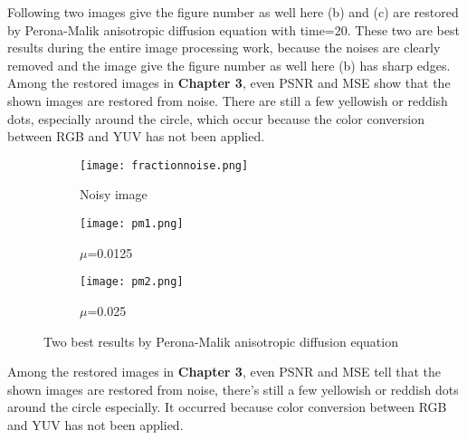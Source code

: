\documentclass[12pt]{report}
\begin{document}
\begin{tableofcontents}
Following two images give the figure number as well here (b) and (c) are restored by Perona-Malik anisotropic diffusion equation with time=20. These two are best results during the entire image processing work, because the noises are clearly removed and the image give the figure number as well here (b) has sharp edges. Among the restored images in \textbf{Chapter 3}, even PSNR and MSE show that the shown images are restored from noise. There are still a few yellowish or reddish dots, especially around the circle, which occur because the color conversion between RGB and YUV has not been applied.
			\begin{figure}[H]
				\centering
				\begin{subfigure}{0.325\textwidth}
					\texttt{[image: fractionnoise.png]}
                    \caption{Noisy image}
				\end{subfigure}
				\begin{subfigure}{0.325\textwidth}
					\texttt{[image: pm1.png]}
                    \caption{$\mu$=0.0125}
				\end{subfigure}
				\begin{subfigure}{0.325\textwidth}
					\texttt{[image: pm2.png]}
                   	\caption{$\mu$=0.025}
				\end{subfigure}
				\caption{Two best results by Perona-Malik anisotropic diffusion equation}
			\end{figure}
\par
Among the restored images in \textbf{Chapter 3}, even PSNR and MSE tell that the shown images are restored from noise, there's still a few yellowish or reddish dots around the circle especially. It occurred because color conversion between RGB and YUV has not been applied.
\newline
\par

	\end{tableofcontents}
\renewcommand{\bibname}{References}


\end{document}
